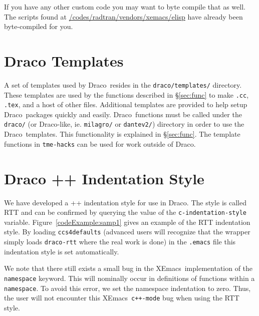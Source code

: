 \documentclass[11pt]{nmemo}
\newcommand{\comp}[1]{{\normalfont\texttt{\footnotesize{#1}}}}
\newcommand{\draco}{{\normalfont\sffamily Draco}}
\newcommand{\xemacs}{{\normalfont\sffamily XEmacs}}
\begin{document}
If you have any other custom code you may want to byte compile that
as well.  The scripts found at
\url{/codes/radtran/vendors/xemacs/elisp} have already been
byte-compiled for you.


\section{Draco Templates}
\label{chap:templates}

A set of templates used by \draco\ resides in the
\comp{draco/templates/} directory.  These templates are used by the
functions described in \S\ref{sec:func} to make \comp{.cc},
\comp{.tex}, and a host of other files.  Additional templates are
provided to help setup \draco\ packages quickly and easily.  \draco\ 
functions must be called under the \comp{draco/} (or \draco-like, ie.
\comp{milagro/} or \comp{dantev2/}) directory in order to use the
\draco\ templates.  This functionality is explained in
\S\ref{sec:func}.  The template functions in \comp{tme-hacks} can be
used for work outside of \draco.


\section{Draco \C++ Indentation Style}

We have developed a \C++ indentation style for use in \draco.  The
style is called RTT and can be confirmed by querying the value of the
\comp{c-indentation-style} variable.  Figure~\ref{codeExample:samp1} gives an
example of the RTT indentation style.  
By loading \comp{ccs4defaults} (advanced users will recognize that the
wrapper simply loads \comp{draco-rtt} where the real work is done) in
the \comp{.emacs} file this indentation style is set automatically.

We note that there still exists a small bug in the \xemacs\ 
implementation of the \comp{namespace} keyword.  This will nominally
occur in definitions of functions within a \comp{namespace}.  To avoid
this error, we set the namespace indentation to zero.  Thus, the user
will not encounter this \xemacs\ \comp{c++-mode} bug when using the
RTT style.
\end{document}
